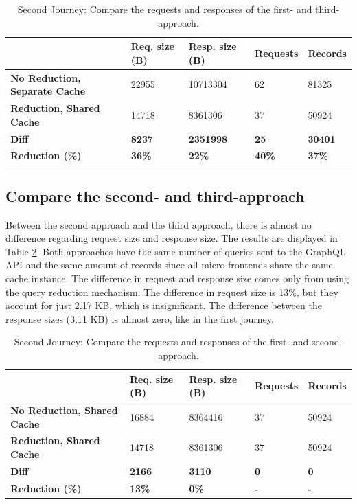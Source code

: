 \ifshowTables
\begin{table}[H]
  \begin{tabular}{|l|l|l|l|l|}
  \hline
  & \textbf{Req. size (B)} & \textbf{Resp. size (B)} & \textbf{Requests} & \textbf{Records} \\
  \hline
  \textbf{No Reduction, Separate Cache} & 22955 & 10713304 & 62 & 81325 \\
  \hline
  \textbf{Reduction, Shared Cache} & 14718 & 8361306 & 37 & 50924 \\
  \hline
  \hline
  \textbf{Diff} & \textbf{8237} & \textbf{2351998} & \textbf{25} & \textbf{30401} \\
  \hline
  \textbf{Reduction (\%)} & \textbf{36\%} & \textbf{22\%} & \textbf{40\%} & \textbf{37\%} \\
  \hline
  \end{tabular}
  \caption{Second Journey: Compare the requests and responses of the first- and third-approach.}\label{table:results:size-comparison-second-path-no-cache-no-reduction-cache-reduction}
\end{table}
\fi

\subsection{Compare the second- and third-approach}\label{subsection:results:comparison-second-path-first-third-approach}

Between the second approach and the third approach, there is almost no difference regarding request size and response size. The results are displayed in Table \ref{table:results:size-comparison-second-path-no-cache-no-reduction-cache-no-reduction}. Both approaches have the same number of queries sent to the GraphQL \ac{API} and the same amount of records since all micro-frontends share the same cache instance. The difference in request and response size comes only from using the query reduction mechanism. The difference in request size is 13\%, but they account for just 2.17 KB, which is insignificant. The difference between the response sizes (3.11 KB) is almost zero, like in the first journey.

\ifshowTables
\begin{table}[H]
\begin{tabular}{|l|l|l|l|l|}
  \hline
  & \textbf{Req. size (B)} & \textbf{Resp. size (B)} & \textbf{Requests} & \textbf{Records} \\
  \hline
  \textbf{No Reduction, Shared Cache} & 16884 & 8364416 & 37 & 50924 \\
  \hline
  \textbf{Reduction, Shared Cache} & 14718 & 8361306 & 37 & 50924 \\
  \hline
  \hline
  \textbf{Diff} & \textbf{2166} & \textbf{3110} & \textbf{0} & \textbf{0} \\
  \hline
  \textbf{Reduction (\%)} & \textbf{13\%} & \textbf{0\%} & \textbf{-} & \textbf{-} \\
  \hline
  \end{tabular}
  \caption{Second Journey: Compare the requests and responses of the first- and second-approach.}\label{table:results:size-comparison-second-path-no-cache-no-reduction-cache-no-reduction}
\end{table}
\fi